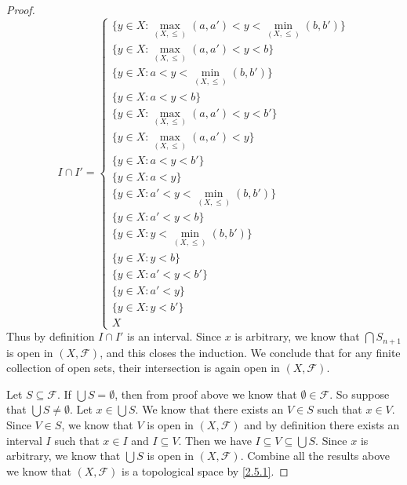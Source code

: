 \begin{proof}
  \[
    I \cap I' = \begin{cases}
      \{y \in X : \max_{(X, \leq)}(a, a') < y < \min_{(X, \leq)}(b, b')\} \\
      \{y \in X : \max_{(X, \leq)}(a, a') < y < b\}                       \\
      \{y \in X : a < y < \min_{(X, \leq)}(b, b')\}                       \\
      \{y \in X : a < y < b\}                                             \\
      \{y \in X : \max_{(X, \leq)}(a, a') < y < b'\}                      \\
      \{y \in X : \max_{(X, \leq)}(a, a') < y\}                           \\
      \{y \in X : a < y < b'\}                                            \\
      \{y \in X : a < y\}                                                 \\
      \{y \in X : a' < y < \min_{(X, \leq)}(b, b')\}                      \\
      \{y \in X : a' < y < b\}                                            \\
      \{y \in X : y < \min_{(X, \leq)}(b, b')\}                           \\
      \{y \in X : y < b\}                                                 \\
      \{y \in X : a' < y < b'\}                                           \\
      \{y \in X : a' < y\}                                                \\
      \{y \in X : y < b'\}                                                \\
      X
    \end{cases}
  \]
  Thus by definition \(I \cap I'\) is an interval.
  Since \(x\) is arbitrary, we know that \(\bigcap S_{n + 1}\) is open in \((X, \mathcal{F})\), and this closes the induction.
  We conclude that for any finite collection of open sets, their intersection is again open in \((X, \mathcal{F})\).

  Let \(S \subseteq \mathcal{F}\).
  If \(\bigcup S = \emptyset\), then from proof above we know that \(\emptyset \in \mathcal{F}\).
  So suppose that \(\bigcup S \neq \emptyset\).
  Let \(x \in \bigcup S\).
  We know that there exists an \(V \in S\) such that \(x \in V\).
  Since \(V \in S\), we know that \(V\) is open in \((X, \mathcal{F})\) and by definition there exists an interval \(I\) such that \(x \in I\) and \(I \subseteq V\).
  Then we have \(I \subseteq V \subseteq \bigcup S\).
  Since \(x\) is arbitrary, we know that \(\bigcup S\) is open in \((X, \mathcal{F})\).
  Combine all the results above we know that \((X, \mathcal{F})\) is a topological space by \cref{2.5.1}.


\end{proof}
